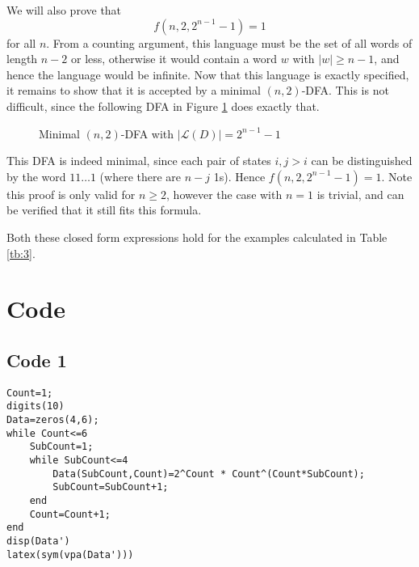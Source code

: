 \documentclass[10pt,a4paper,notitlepage]{article}
\newcommand{\abs}[1]{\lvert#1\rvert}
\begin{document}
We will also prove that
\begin{equation}
f(n,2,2^{n-1}-1)=1
\end{equation}
for all $n$. From a counting argument, this language must be the set of all words of length $n-2$ or less, otherwise it would contain a word $w$ with $\abs{w}\geq n-1$, and hence the language would be infinite. Now that this language is exactly specified, it remains to show that it is accepted by a minimal $(n,2)$-DFA. This is not difficult, since the following DFA in Figure \ref{fg:3} does exactly that.
\begin{figure}[H]
\centering
{}
\caption{Minimal $(n,2)$-DFA with $\abs{\mathcal{L}(D)}=2^{n-1}-1$}\label{fg:3}
\end{figure}
This DFA is indeed minimal, since each pair of states $i,j>i$ can be distinguished by the word $11\hdots 1$ (where there are $n-j$ 1s). Hence $f(n,2,2^{n-1}-1)=1$. Note this proof is only valid for $n\geq 2$, however the case with $n=1$ is trivial, and can be verified that it still fits this formula.

Both these closed form expressions hold for the examples calculated in Table \ref{tb:3}.


\pagebreak
\section*{\centering Code}
\subsection*{\centering Code 1}\label{cd:1}
\begin{verbatim}
Count=1;
digits(10)
Data=zeros(4,6);
while Count<=6
    SubCount=1;
    while SubCount<=4
        Data(SubCount,Count)=2^Count * Count^(Count*SubCount);
        SubCount=SubCount+1;
    end
    Count=Count+1;
end
disp(Data')
latex(sym(vpa(Data')))
\end{verbatim}
\pagebreak
\end{document}
